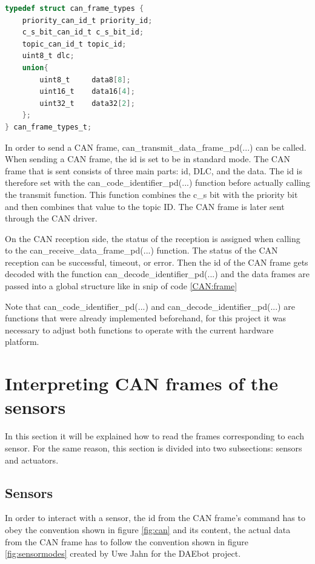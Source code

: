 \documentclass[12pt]{report}%
\begin{document}
\begin{minipage}{\linewidth}
\begin{lstlisting}[caption = CAN frame, label = CAN:frame, language = C, captionpos = b]
typedef struct can_frame_types {
    priority_can_id_t priority_id;
    c_s_bit_can_id_t c_s_bit_id;
    topic_can_id_t topic_id;
    uint8_t dlc;
    union{
        uint8_t     data8[8];
        uint16_t    data16[4];
        uint32_t    data32[2];
    };
} can_frame_types_t;
\end{lstlisting}
\end{minipage}

In order to send a CAN frame, can\_transmit\_data\_frame\_pd(...) can be called. When sending a CAN frame, the id is set to be in standard mode. The CAN frame that is sent consists of three main parts: id, DLC, and the data. The id is therefore set with the can\_code\_identifier\_pd(...) function before actually calling the transmit function. This function combines the c\_s bit with the priority bit and then combines that value to the topic ID. The CAN frame is later sent through the CAN driver.

On the CAN reception side, the status of the reception is assigned when calling to the can\_receive\_data\_frame\_pd(...) function. The status of the CAN reception can be successful, timeout, or error. Then the id of the CAN frame gets decoded with the function can\_decode\_identifier\_pd(...) and the data frames are passed into a global structure like in snip of code \ref{CAN:frame}

Note that can\_code\_identifier\_pd(...) and can\_decode\_identifier\_pd(...) are functions that were already implemented beforehand, for this project it was necessary to adjust both functions to operate with the current hardware platform.

\section{Interpreting CAN frames of the sensors}
\label{sec:sensorout}
In this section it will be explained how to read the frames corresponding to each sensor. For the same reason, this section is divided into two subsections: sensors and actuators.

\subsection{Sensors}
\label{sub:sensors}
In order to interact with a sensor, the id from the CAN frame's command has to obey the convention shown in figure \ref{fig:can} and its content, the actual data from the CAN frame has to follow the convention shown in figure  \ref{fig:sensormodes} created by Uwe Jahn for the DAEbot project.
\end{document}
